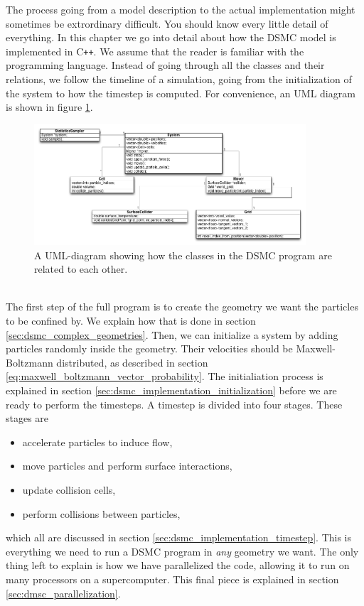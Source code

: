 The process going from a model description to the actual implementation might sometimes be extrordinary difficult. You should know every little detail of everything. In this chapter we go into detail about how the DSMC model is implemented in C{}\verb!++!. We assume that the reader is familiar with the programming language. Instead of going through all the classes and their relations, we follow the timeline of a simulation, going from the initialization of the system to how the timestep is computed. For convenience, an UML diagram is shown in figure \ref{fig:dsmc_uml_diagram}.
\begin{figure}[h]
\begin{center}
\includegraphics[width=0.9\textwidth, trim=0cm 0cm 0cm 0cm, clip]{DSMC/figures/dsmcuml.png}
\end{center}
\caption{A UML-diagram showing how the classes in the DSMC program are related to each other.}
\label{fig:dsmc_uml_diagram}
\end{figure}
\\
The first step of the full program is to create the geometry we want the particles to be confined by. We explain how that is done in section \ref{sec:dsmc_complex_geometries}. Then, we can initialize a system by adding particles randomly inside the geometry. Their velocities should be Maxwell-Boltzmann distributed, as described in section \ref{eq:maxwell_boltzmann_vector_probability}. The initialiation process is explained in section \ref{sec:dsmc_implementation_initialization} before we are ready to perform the timesteps. A timestep is divided into four stages. These stages are
\begin{itemize}
    \item accelerate particles to induce flow,
    \item move particles and perform surface interactions,
    \item update collision cells,
    \item perform collisions between particles,
\end{itemize}
which all are discussed in section \ref{sec:dsmc_implementation_timestep}. This is everything we need to run a DSMC program in \textit{any} geometry we want. The only thing left to explain is how we have parallelized the code, allowing it to run on many processors on a supercomputer. This final piece is explained in section \ref{sec:dmsc_parallelization}. 